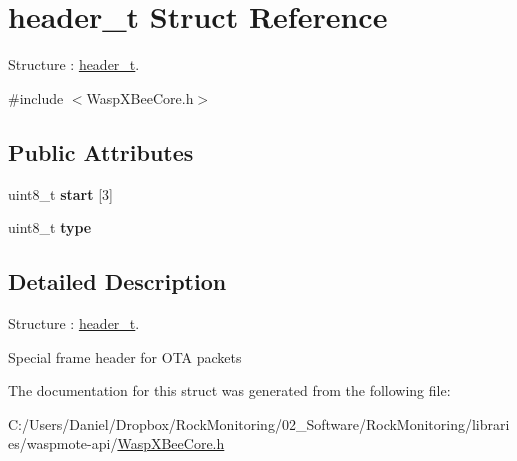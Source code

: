 \hypertarget{structheader__t}{}\section{header\+\_\+t Struct Reference}
\label{structheader__t}


Structure \+: \hyperlink{structheader__t}{header\+\_\+t}.  




{\ttfamily \#include $<$Wasp\+X\+Bee\+Core.\+h$>$}

\subsection*{Public Attributes}
\begin{DoxyCompactItemize}
\item 
uint8\+\_\+t {\bfseries start} \mbox{[}3\mbox{]}\hypertarget{structheader__t_aa25d15f1defcc67542d956cfee6db32c}{}\label{structheader__t_aa25d15f1defcc67542d956cfee6db32c}

\item 
uint8\+\_\+t {\bfseries type}\hypertarget{structheader__t_adcac329e1e1b7e00f9664c5e5a5f4730}{}\label{structheader__t_adcac329e1e1b7e00f9664c5e5a5f4730}

\end{DoxyCompactItemize}


\subsection{Detailed Description}
Structure \+: \hyperlink{structheader__t}{header\+\_\+t}. 

Special frame header for O\+TA packets 

The documentation for this struct was generated from the following file\+:\begin{DoxyCompactItemize}
\item 
C\+:/\+Users/\+Daniel/\+Dropbox/\+Rock\+Monitoring/02\+\_\+\+Software/\+Rock\+Monitoring/libraries/waspmote-\/api/\hyperlink{_wasp_x_bee_core_8h}{Wasp\+X\+Bee\+Core.\+h}\end{DoxyCompactItemize}
